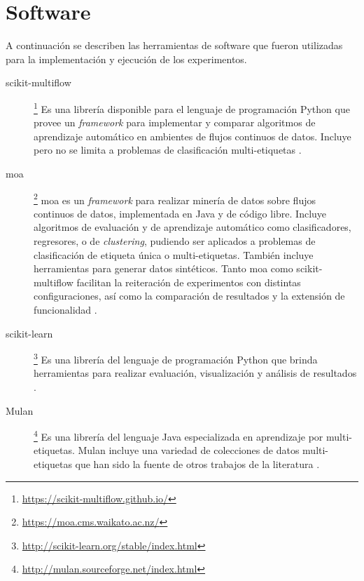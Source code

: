 \section{Software}

A continuación se describen las herramientas de software que fueron utilizadas
para la implementación y ejecución de los experimentos.

\begin{description}

	\item[scikit-multiflow]\footnote{\url{https://scikit-multiflow.github.io/}} Es
	      una librería disponible para el lenguaje de programación Python que provee
	      un \textit{framework} para implementar y comparar algoritmos de aprendizaje
	      automático en ambientes de flujos continuos de datos. Incluye pero no se
	      limita a problemas de clasificación multi-etiquetas
	      \cite{montiel_scikit-multiflow_2018}.

	\item[\acrshort{moa}]\footnote{\url{https://moa.cms.waikato.ac.nz/}}
	      \acrfull{moa} es un \textit{framework} para realizar minería de datos sobre
	      flujos continuos de datos, implementada en Java y de código libre.  Incluye
	      algoritmos de evaluación y de aprendizaje automático como clasificadores,
	      regresores, o de \textit{clustering}, pudiendo ser aplicados a problemas de
	      clasificación de etiqueta única o multi-etiquetas.  También incluye
	      herramientas para generar datos sintéticos. Tanto \acrshort{moa} como
	      scikit-multiflow facilitan la reiteración de experimentos con distintas
	      configuraciones, así como la comparación de resultados y la extensión de
	      funcionalidad \cite{bifet_moa_2010}.

	\item[scikit-learn]\footnote{\url{http://scikit-learn.org/stable/index.html}}
	      Es una librería del lenguaje de programación Python que brinda
	      herramientas para realizar evaluación, visualización y análisis de
	      resultados \cite{pedregosa_scikit-learn_2018}.

	\item[Mulan]\footnote{\url{http://mulan.sourceforge.net/index.html}} Es una
	      librería del lenguaje Java especializada en aprendizaje por
	      multi-etiquetas. Mulan incluye una variedad de colecciones de datos
	      multi-etiquetas que han sido la fuente de otros trabajos de la literatura
	      \cite{tsoumakas_mulan_2011}.

\end{description} 

